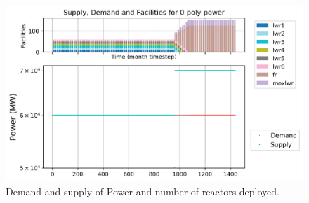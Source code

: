 \documentclass[11pt]{article}
\begin{document}
\begin{figure}[H]
	\centering
	\includegraphics[width=\textwidth]{29-figures/0-poly-power.png} 
	\hfill
	\caption{Demand and supply of Power and number of reactors deployed.}
	\label{fig:29-power}
\end{figure}
\end{document}
